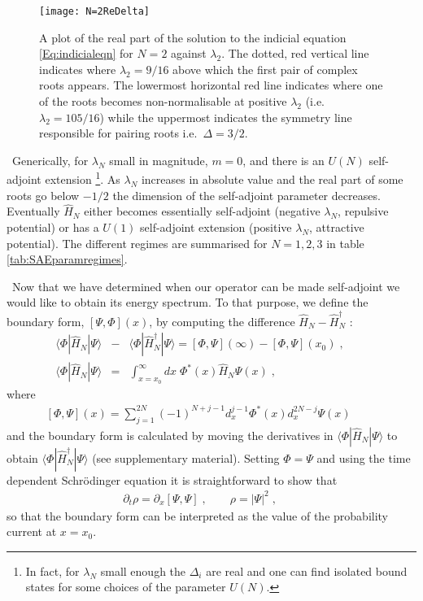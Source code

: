 \documentclass[aps,prl,reprint,preprintnumbers]{revtex4-1}
\begin{document}
\begin{figure}[!t]
  \centering
  \texttt{[image: N=2ReDelta]}
  \caption{A plot of the real part of the solution to the indicial equation \eqref{Eq:indicialeqn} for $N=2$ against $\lambda_{2}$. The dotted, red vertical line indicates where $\lambda_{2}=9/16$ above which the first pair of complex roots appears. The lowermost horizontal red line indicates where one of the roots becomes non-normalisable at positive $\lambda_{2}$ (i.e.~$\lambda_{2}=105/16$) while the uppermost indicates the symmetry line responsible for pairing roots i.e.~$\Delta=3/2$.}
  \label{fig:N=4realpartofroots}
  \vspace{-1em}
\end{figure}

{\ Generically, for $\lambda_{N}$ small in magnitude, $m =0$, and there is an $U(N)$ self-adjoint extension \footnote{In fact, for $\lambda_{N}$ small enough the $\Delta_{i}$ are real and one can find isolated bound states for some choices of the parameter $U(N)$.}. As $\lambda_{N}$ increases in absolute value and the real part of some roots go below $-1/2$ the dimension of the self-adjoint parameter decreases. Eventually $\hat{H}_{N}$ either becomes essentially self-adjoint (negative $\lambda_{N}$, repulsive potential) or has a $U(1)$ self-adjoint extension (positive $\lambda_{N}$, attractive potential). The different regimes are summarised for $N=1,2,3$ in table \ref{tab:SAEparamregimes}.}

{\ Now that we have determined when our operator can be made self-adjoint we would like to obtain its energy spectrum. To that purpose, we define the boundary form, $\left[ \Psi, \Phi \right](x)$, by computing the difference $\hat{H}_N - \hat{H}^\dagger _N$ :
  \begin{eqnarray}
   \label{Eq:differenceHamiltonians}
   \langle \Phi | \hat{H}_{N} | \Psi \rangle &-& \langle \Phi | \hat{H}^{\dagger}_{N} | \Psi \rangle = \left[ \Phi, \Psi \right](\infty) - \left[ \Phi, \Psi \right](x_{0}) \; , \qquad \\
   \langle \Phi | \hat{H}_{N} | \Psi \rangle &=& \int_{x=x_{0}}^{\infty} dx \; \Phi^{*}(x) \hat{H}_{N} \Psi(x) \; , 
  \end{eqnarray}
where
  \begin{eqnarray}
   \label{Eq:asymmetryform}
   \left[ \Phi, \Psi \right](x) = \sum_{j=1}^{2N} (-1)^{N+j-1} d_{x}^{j-1} \Phi^{*}(x) d_{x}^{2N-j} \Psi(x) \;  \qquad
  \end{eqnarray}
and the boundary form is calculated by moving the derivatives in $\langle \Phi | \hat{H}_{N} | \Psi \rangle$ to obtain $\langle \Phi | \hat{H}_{N}^{\dagger} | \Psi \rangle$ (see supplementary material). Setting $\Phi=\Psi$ and using the time dependent Schr\"{o}dinger equation it is straightforward to show that 
  \begin{eqnarray}
    \partial_{t} \rho = \partial_{x} \left[ \Psi, \Psi \right] \; , \qquad \rho = |\Psi|^2 \; , \qquad
  \end{eqnarray}
so that the boundary form can be interpreted as the value of the probability current at $x=x_{0}$.}
\end{document}
